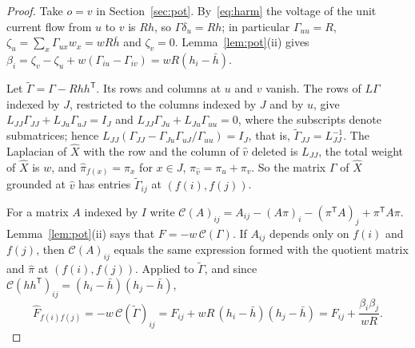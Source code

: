 \documentclass[11pt]{amsart}
\theoremstyle{definition}
\newcommand{\hpi}{\widehat{\pi}}
\newcommand{\hX}{\widehat{X}}
\newcommand{\hF}{\widehat{F}}
\begin{document}
\begin{proof}
Take $o=v$ in Section~\ref{sec:pot}. By~\eqref{eq:harm} the voltage of the unit current flow from $u$ to $v$ is $Rh$,
so $\Gamma\delta_u=Rh$; in particular $\Gamma_{uu}=R$, $\zeta_u=\sum_x\Gamma_{ux}w_x=wR\bar h$ and $\zeta_v=0$.
Lemma~\ref{lem:pot}(ii) gives $\beta_i=\zeta_v-\zeta_u+w(\Gamma_{iu}-\Gamma_{iv})=wR(h_i-\bar h)$.

Let $\widetilde\Gamma=\Gamma-Rhh^{\mathsf T}$. Its rows and columns at $u$ and $v$ vanish. The rows of
$L\Gamma$ indexed by $J$, restricted to the columns indexed by $J$ and by $u$, give
$L_{JJ}\Gamma_{JJ}+L_{Ju}\Gamma_{uJ}=I_J$ and $L_{JJ}\Gamma_{Ju}+L_{Ju}\Gamma_{uu}=0$, where the subscripts denote
submatrices; hence $L_{JJ}(\Gamma_{JJ}-\Gamma_{Ju}\Gamma_{uJ}/\Gamma_{uu})=I_J$, that is,
$\widetilde\Gamma_{JJ}=L_{JJ}^{-1}$. The Laplacian of $\hX$ with the row and the column of $\hat v$ deleted is
$L_{JJ}$, the total weight of $\hX$ is $w$, and $\hpi_{f(x)}=\pi_x$ for $x\in J$, $\hpi_{\hat v}=\pi_u+\pi_v$. So the
matrix $\Gamma$ of $\hX$ grounded at $\hat v$ has entries $\widetilde\Gamma_{ij}$ at $(f(i),f(j))$.

For a matrix $A$ indexed by $I$ write $\mathcal C(A)_{ij}=A_{ij}-(A\pi)_i-(\pi^{\mathsf T}A)_j+\pi^{\mathsf T}A\pi$.
Lemma~\ref{lem:pot}(ii) says that $F=-w\,\mathcal C(\Gamma)$. If $A_{ij}$ depends only on $f(i)$ and $f(j)$, then
$\mathcal C(A)_{ij}$ equals the same expression formed with the quotient matrix and $\hpi$ at $(f(i),f(j))$. Applied
to $\widetilde\Gamma$, and since $\mathcal C(hh^{\mathsf T})_{ij}=(h_i-\bar h)(h_j-\bar h)$,
\[
\hF_{f(i)f(j)}=-w\,\mathcal C(\widetilde\Gamma)_{ij}=F_{ij}+wR\,(h_i-\bar h)(h_j-\bar h)
=F_{ij}+\frac{\beta_i\beta_j}{wR}.
\]


\end{proof}
\end{document}
